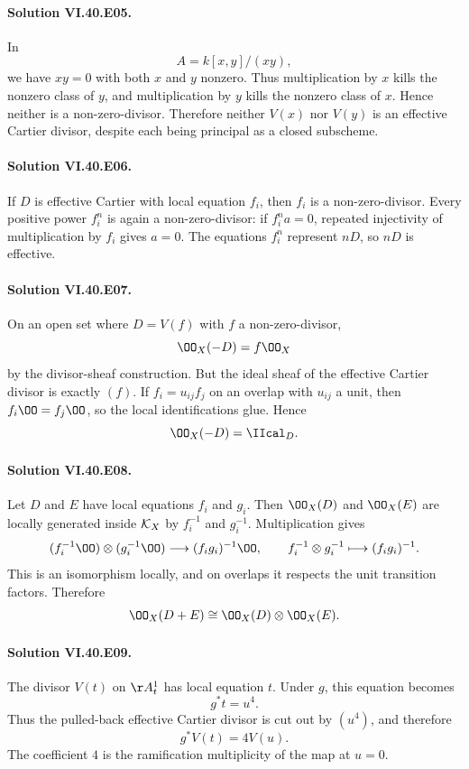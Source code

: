\paragraph{Solution VI.40.E05.}
In
\[
A=k[x,y]/(xy),
\]
we have \(xy=0\) with both \(x\) and \(y\) nonzero.  Thus multiplication by \(x\) kills the nonzero class of \(y\), and multiplication by \(y\) kills the nonzero class of \(x\).  Hence neither is a non-zero-divisor.  Therefore neither \(V(x)\) nor \(V(y)\) is an effective Cartier divisor, despite each being principal as a closed subscheme.

\paragraph{Solution VI.40.E06.}
If \(D\) is effective Cartier with local equation \(f_i\), then \(f_i\) is a non-zero-divisor.  Every positive power \(f_i^n\) is again a non-zero-divisor: if \(f_i^n a=0\), repeated injectivity of multiplication by \(f_i\) gives \(a=0\).  The equations \(f_i^n\) represent \(nD\), so \(nD\) is effective.

\paragraph{Solution VI.40.E07.}
On an open set where \(D=V(f)\) with \(f\) a non-zero-divisor,
\[
\OO_X(-D)=f\OO_X
\]
by the divisor-sheaf construction.  But the ideal sheaf of the effective Cartier divisor is exactly \((f)\).  If \(f_i=u_{ij}f_j\) on an overlap with \(u_{ij}\) a unit, then \(f_i\OO=f_j\OO\), so the local identifications glue.  Hence
\[
\OO_X(-D)=\IIcal_D.
\]

\paragraph{Solution VI.40.E08.}
Let \(D\) and \(E\) have local equations \(f_i\) and \(g_i\).  Then \(\OO_X(D)\) and \(\OO_X(E)\) are locally generated inside \(\mathcal{K}_X\) by \(f_i^{-1}\) and \(g_i^{-1}\).  Multiplication gives
\[
(f_i^{-1}\OO)\otimes(g_i^{-1}\OO)\longrightarrow(f_i g_i)^{-1}\OO,
\qquad
f_i^{-1}\otimes g_i^{-1}\longmapsto(f_i g_i)^{-1}.
\]
This is an isomorphism locally, and on overlaps it respects the unit transition factors.  Therefore
\[
\OO_X(D+E)\cong\OO_X(D)\otimes\OO_X(E).
\]

\paragraph{Solution VI.40.E09.}
The divisor \(V(t)\) on \(\AA^1_t\) has local equation \(t\).  Under \(g\), this equation becomes
\[
g^*t=u^4.
\]
Thus the pulled-back effective Cartier divisor is cut out by \((u^4)\), and therefore
\[
g^*V(t)=4V(u).
\]
The coefficient \(4\) is the ramification multiplicity of the map at \(u=0\).

